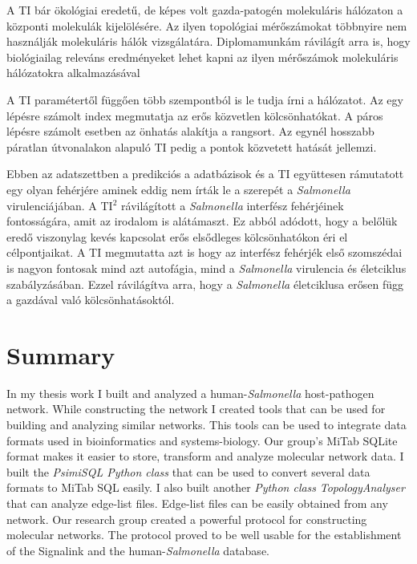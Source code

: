 \documentclass[a4paper,12pt]{article}
\begin{document}
		A TI bár ökológiai eredetű, de képes volt gazda-patogén molekuláris hálózaton a központi molekulák kijelölésére. Az ilyen topológiai mérőszámokat többnyire nem használják molekuláris hálók vizsgálatára. Diplomamunkám rávilágít arra is, hogy biológiailag releváns eredményeket lehet kapni az ilyen mérőszámok molekuláris hálózatokra alkalmazásával
		
		A TI paramétertől függően több szempontból is le tudja írni a hálózatot. Az egy lépésre számolt index megmutatja az erős közvetlen kölcsönhatókat. A páros lépésre számolt esetben az önhatás alakítja a rangsort. Az egynél hosszabb páratlan útvonalakon alapuló TI pedig a pontok közvetett hatását jellemzi.
		
		Ebben az adatszettben a predikciós a adatbázisok és a TI együttesen rámutatott egy olyan fehérjére aminek eddig nem írták le a szerepét a \textit{Salmonella} virulenciájában. A TI$^2$ rávilágított a \textit{Salmonella} interfész fehérjéinek fontosságára, amit az irodalom is alátámaszt. Ez abból adódott, hogy a belőlük eredő viszonylag kevés kapcsolat erős elsődleges kölcsönhatókon éri el célpontjaikat. A TI megmutatta azt is hogy az interfész fehérjék első szomszédai is nagyon fontosak mind azt autofágia, mind a \textit{Salmonella} virulencia és életciklus szabályzásában. Ezzel rávilágítva arra, hogy a \textit{Salmonella} életciklusa erősen függ a gazdával való kölcsönhatásoktól.
		
		
		\pagebreak
		
		

\section{Summary}
		
		In my thesis work I built and analyzed a human-\textit{Salmonella} host-pathogen network. While constructing the network I created tools that can be used for building and analyzing similar networks. This tools can be used to integrate data formats used in bioinformatics and systems-biology. Our group's MiTab SQLite format makes it easier to  store, transform and analyze molecular network data.
		I built the \textit{PsimiSQL Python class} that can be used to convert several data formats to MiTab SQL easily. I also built another \textit{Python class} \textit{TopologyAnalyser} that can analyze edge-list files. Edge-list files can be easily obtained from any network. Our research group created a powerful protocol for constructing molecular networks. The protocol proved to be well usable for the establishment of the Signalink and the human-\textit{Salmonella} database.
		
\end{document}
